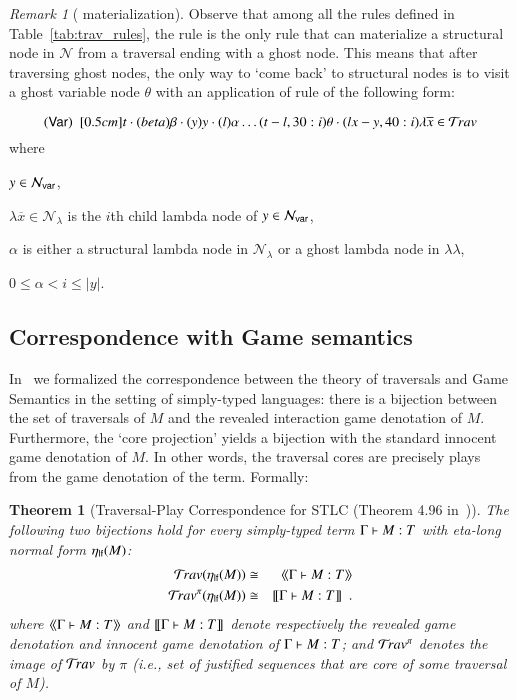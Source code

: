 \documentclass{elsarticle}
\makeatletter
\theoremstyle{plain}
\newtheorem{theorem}{Theorem}[section]
\theoremstyle{definition}
\theoremstyle{remark}
\newtheorem{remark}{Remark}[section]
\newcommand\Nodes{\mathcal{N}}%
\newcommand\NodesVar{\Nodes_{\sf var}}%
\newcommand\NodesLmd{\Nodes_\lambda}%
\newcommand{\ghostlmd}{{\lambda\!\!\lambda}}
\newcommand{\ghostvar}{\theta}
\newcommand{\travulc}{\travset}
\def\coresymbol{\pi} %
\renewcommand\ie{{\it i.e.\@\xspace}}
\makeatother
\begin{document}
\begin{remark}[ materialization]
Observe that among all the rules defined in Table~\ref{tab:trav_rules}, the rule  is the only rule that can materialize a structural node in $\Nodes$ from a traversal ending with a ghost node. This means that after traversing ghost nodes, the only way to `come back' to structural nodes is to visit a ghost variable node $\ghostvar$ with an application of rule  of the following form:

$$\rulename{Var}\ \  \Pstr[0.5cm]{ t \cdot(beta){\beta} \cdot
(y){y} \cdot (l){\alpha}  \ldots (t-l,30:i){\ghostvar}
    \cdot (lx-y,40:i){\lambda \overline{x}}
     \in\travulc}$$
where
\begin{itemize*}[nosep,label=]
\item $y \in \NodesVar$,
\item $\lambda \overline{x} \in \NodesLmd$ is the $i$th child lambda node of $y \in \NodesVar$,
\item $\alpha$ is either a structural lambda node in $\Nodes_\lambda$ or a ghost lambda node in $\ghostlmd$,
\item $0\leq \alpha < i \leq |y|$.
\end{itemize*}
\end{remark}

\subsection{Correspondence with Game semantics}
\label{sec:traversal_correspondence_stlc}

In~\cite{BlumPhd} we formalized the correspondence between the theory of traversals and Game Semantics in the setting of simply-typed languages: there is a bijection between the set of traversals of $M$ and the revealed interaction game denotation of $M$. Furthermore, the `core projection' yields a bijection with the standard innocent game denotation of $M$.
In other words, the traversal cores are precisely plays from the game denotation of the term.
Formally:
\begin{theorem}[Traversal-Play Correspondence for STLC (Theorem 4.96 in~\cite{BlumPhd})]
\label{thm:gamesem_correspondence_stlc}
The following two bijections hold for every simply-typed term $\Gamma \vdash M :T$ with eta-long normal form $\eta_{\sf lf}(M)$:
\begin{eqnarray*}
 \travulc(\etalf{M}) & \cong & \revsem{\Gamma \entail M :T} \\
 \travulc^\coresymbol(\etalf{M}) & \cong & \sem{\Gamma \entail M :T} \enspace .
\end{eqnarray*}
where ${\langle\!\langle \Gamma \vdash M : T \rangle\!\rangle}$ and
${[\![ \Gamma \vdash M : T ]\!]}$
denote respectively the \emph{revealed game denotation} and \emph{innocent game denotation} of
$\Gamma \vdash M : T$;
and $\travulc^\coresymbol$ denotes the image of $\travulc$ by $\coresymbol$ (\ie, set of justified sequences that are \emph{core} of some traversal of $M$).
\end{theorem}
\end{document}
